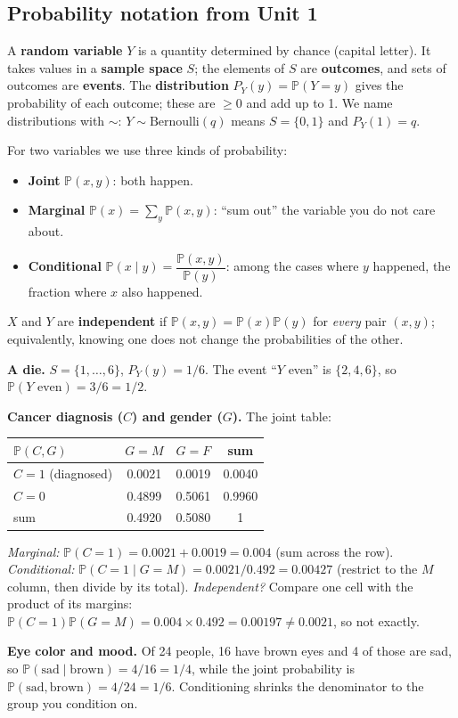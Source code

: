 \documentclass[11pt]{article}
\renewcommand{\P}{\mathbb{P}}
\newcommand{\given}{\mid}
\newcommand{\Bern}{\text{Bernoulli}}
\begin{document}
\subsection{Probability notation from Unit 1}
A \textbf{random variable} $Y$ is a quantity determined by chance (capital letter). It takes values in a \textbf{sample space} $S$; the
elements of $S$ are \textbf{outcomes}, and sets of outcomes are \textbf{events}. The \textbf{distribution} $P_Y(y)=\P(Y=y)$ gives the
probability of each outcome; these are $\ge0$ and add up to 1. We name distributions with $\sim$: $Y\sim\Bern(q)$ means
$S=\{0,1\}$ and $P_Y(1)=q$.

For two variables we use three kinds of probability:
\begin{itemize}[leftmargin=*,itemsep=2pt]
\item \textbf{Joint} $\P(x,y)$: both happen.
\item \textbf{Marginal} $\P(x)=\sum_y\P(x,y)$: ``sum out'' the variable you do not care about.
\item \textbf{Conditional} $\P(x\given y)=\dfrac{\P(x,y)}{\P(y)}$: among the cases where $y$ happened, the fraction where $x$ also happened.
\end{itemize}
$X$ and $Y$ are \textbf{independent} if $\P(x,y)=\P(x)\P(y)$ for \emph{every} pair $(x,y)$; equivalently, knowing one does not change the
probabilities of the other.

\begin{examplebox}[title={Examples (Lectures 1--2)}]
\textbf{A die.} $S=\{1,\dots,6\}$, $P_Y(y)=1/6$. The event ``$Y$ even'' is $\{2,4,6\}$, so $\P(Y\text{ even})=3/6=1/2$.

\textbf{Cancer diagnosis ($C$) and gender ($G$).} The joint table:
\begin{center}
\begin{tabular}{lccc}
\toprule
$\P(C,G)$ & $G=M$ & $G=F$ & sum\\\midrule
$C=1$ (diagnosed) & 0.0021 & 0.0019 & 0.0040\\
$C=0$ & 0.4899 & 0.5061 & 0.9960\\\midrule
sum & 0.4920 & 0.5080 & 1\\
\bottomrule
\end{tabular}
\end{center}
\emph{Marginal:} $\P(C=1)=0.0021+0.0019=0.004$ (sum across the row). \emph{Conditional:}
$\P(C=1\given G=M)=0.0021/0.492=0.00427$ (restrict to the $M$ column, then divide by its total).
\emph{Independent?} Compare one cell with the product of its margins: $\P(C{=}1)\P(G{=}M)=0.004\times0.492=0.00197\ne0.0021$, so not exactly.

\textbf{Eye color and mood.} Of 24 people, 16 have brown eyes and 4 of those are sad, so $\P(\text{sad}\given\text{brown})=4/16=1/4$,
while the joint probability is $\P(\text{sad},\text{brown})=4/24=1/6$. Conditioning shrinks the denominator to the group you condition on.
\end{examplebox}
\end{document}

